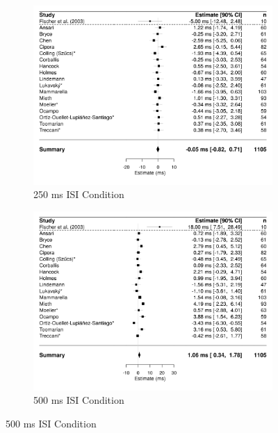 \documentclass[man,floatsintext]{apa6}
\theoremstyle{definition}
\theoremstyle{definition}
\theoremstyle{definition}
\theoremstyle{remark}
\begin{document}
\begin{figure}[H]
    \centering
    \begin{subfigure}{.5\textwidth}
        \includegraphics[]{d250}
        \caption{250 ms ISI Condition}
    \end{subfigure}
    \begin{subfigure}{.5\textwidth}
        \includegraphics[]{d500}
        \caption{500 ms ISI Condition}
    \end{subfigure}
\end{figure}\begin{figure}[H]
    \centering
    \ContinuedFloat %
    \begin{subfigure}{.5\textwidth}

\end{subfigure}
\end{figure}
\end{document}
